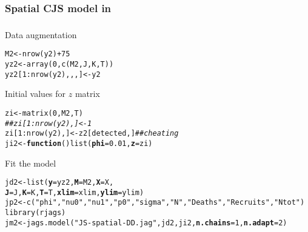 \documentclass[color=usenames,dvipsnames]{beamer}\usepackage[]{graphicx}\usepackage[]{color}
\makeatletter
\newcommand{\hlnum}[1]{\textcolor[rgb]{0.69,0.494,0}{#1}}%
\newcommand{\hlstr}[1]{\textcolor[rgb]{0.749,0.012,0.012}{#1}}%
\newcommand{\hlcom}[1]{\textcolor[rgb]{0.514,0.506,0.514}{\textit{#1}}}%
\newcommand{\hlopt}[1]{\textcolor[rgb]{0,0,0}{#1}}%
\newcommand{\hlstd}[1]{\textcolor[rgb]{0,0,0}{#1}}%
\newcommand{\hlkwa}[1]{\textcolor[rgb]{0,0,0}{\textbf{#1}}}%
\newcommand{\hlkwb}[1]{\textcolor[rgb]{0,0.341,0.682}{#1}}%
\newcommand{\hlkwc}[1]{\textcolor[rgb]{0,0,0}{\textbf{#1}}}%
\newcommand{\hlkwd}[1]{\textcolor[rgb]{0.004,0.004,0.506}{#1}}%
\newenvironment{kframe}{%
 \def\at@end@of@kframe{}%
 \ifinner\ifhmode%
  \def\at@end@of@kframe{\end{minipage}}%
  \begin{minipage}{\columnwidth}%
 \fi\fi%
 \def\FrameCommand##1{\hskip\@totalleftmargin \hskip-\fboxsep
 \colorbox{shadecolor}{##1}\hskip-\fboxsep
     \hskip-\linewidth \hskip-\@totalleftmargin \hskip\columnwidth}%
 \MakeFramed {\advance\hsize-\width
   \@totalleftmargin\z@ \linewidth\hsize
   \@setminipage}}%
 {\par\unskip\endMakeFramed%
 \at@end@of@kframe}
\newenvironment{knitrout}{}{} %
\makeatother
\begin{document}
\begin{frame}[fragile]
  \frametitle{Spatial CJS model in \jags}
  \vspace{-5mm}
  \tiny \fbox{\parbox{\linewidth}{}}
\end{frame}





\begin{frame}[fragile]
  \frametitle{\jags}
  {Data augmentation}
  \scriptsize
\begin{knitrout}
\color{fgcolor}\begin{kframe}
\begin{alltt}
\hlstd{M2} \hlkwb{<-} \hlkwd{nrow}\hlstd{(y2)} \hlopt{+} \hlnum{75}
\hlstd{yz2} \hlkwb{<-} \hlkwd{array}\hlstd{(}\hlnum{0}\hlstd{,} \hlkwd{c}\hlstd{(M2, J, K, T))}
\hlstd{yz2[}\hlnum{1}\hlopt{:}\hlkwd{nrow}\hlstd{(y2),,,]} \hlkwb{<-} \hlstd{y2}
\end{alltt}
\end{kframe}
\end{knitrout}
\pause
\vfill
  {\normalsize Initial values for $z$ matrix}
\begin{knitrout}
\color{fgcolor}\begin{kframe}
\begin{alltt}
\hlstd{zi} \hlkwb{<-} \hlkwd{matrix}\hlstd{(}\hlnum{0}\hlstd{, M2, T)}
\hlcom{##zi[1:nrow(y2),] <- 1}
\hlstd{zi[}\hlnum{1}\hlopt{:}\hlkwd{nrow}\hlstd{(y2),]} \hlkwb{<-} \hlstd{z2[detected,]} \hlcom{## cheating}
\hlstd{ji2} \hlkwb{<-} \hlkwa{function}\hlstd{()} \hlkwd{list}\hlstd{(}\hlkwc{phi}\hlstd{=}\hlnum{0.01}\hlstd{,} \hlkwc{z}\hlstd{=zi)}
\end{alltt}
\end{kframe}
\end{knitrout}
\pause
\vfill
  {\normalsize Fit the model}
\begin{knitrout}
\color{fgcolor}\begin{kframe}
\begin{alltt}
\hlstd{jd2} \hlkwb{<-} \hlkwd{list}\hlstd{(}\hlkwc{y}\hlstd{=yz2,} \hlkwc{M}\hlstd{=M2,} \hlkwc{X}\hlstd{=X,}
            \hlkwc{J}\hlstd{=J,} \hlkwc{K}\hlstd{=K,} \hlkwc{T}\hlstd{=T,} \hlkwc{xlim}\hlstd{=xlim,} \hlkwc{ylim}\hlstd{=ylim)}
\hlstd{jp2} \hlkwb{<-} \hlkwd{c}\hlstd{(}\hlstr{"phi"}\hlstd{,} \hlstr{"nu0"}\hlstd{,} \hlstr{"nu1"}\hlstd{,} \hlstr{"p0"}\hlstd{,} \hlstr{"sigma"}\hlstd{,} \hlstr{"N"}\hlstd{,} \hlstr{"Deaths"}\hlstd{,} \hlstr{"Recruits"}\hlstd{,} \hlstr{"Ntot"}\hlstd{)}
\hlkwd{library}\hlstd{(rjags)}
\hlstd{jm2} \hlkwb{<-} \hlkwd{jags.model}\hlstd{(}\hlstr{"JS-spatial-DD.jag"}\hlstd{, jd2, ji2,} \hlkwc{n.chains}\hlstd{=}\hlnum{1}\hlstd{,} \hlkwc{n.adapt}\hlstd{=}\hlnum{2}\hlstd{)}
\end{alltt}



\end{kframe}
\end{knitrout}
\end{frame}
\end{document}

